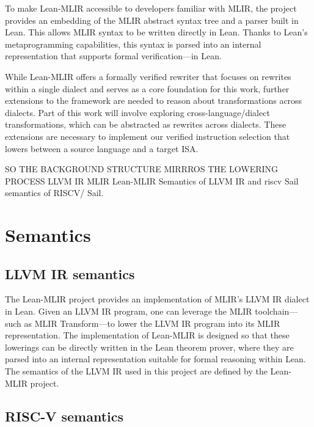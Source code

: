 To make Lean-MLIR accessible to developers familiar with MLIR, the project provides an embedding of the MLIR abstract syntax tree and a parser built in Lean. This allows MLIR syntax to be written directly in Lean. Thanks to Lean’s metaprogramming capabilities, this syntax is parsed into an internal representation that supports formal verification—in Lean.

While Lean-MLIR offers a formally verified rewriter that focuses on rewrites within a single dialect and serves as a core foundation for this work, further extensions to the framework are needed to reason about transformations across dialects.  Part of this work will involve exploring cross-language/dialect transformations, which can be abstracted as rewrites across dialects. These extensions are necessary to implement our verified instruction selection that lowers between a source language and a target ISA. 








SO THE BACKGROUND STRUCTURE MIRRROS THE LOWERING PROCESS 
 LLVM IR
 MLIR 
 Lean-MLIR 
 Semantics of LLVM IR and 
 riscv 
 Sail semantics of RISCV/ Sail. 




\section {Semantics}
\subsection {LLVM IR semantics}
The Lean-MLIR project provides an implementation of MLIR's LLVM IR dialect in Lean. Given an LLVM IR program, one can leverage the MLIR toolchain—such as MLIR Transform—to lower the LLVM IR program into its MLIR representation.
The implementation of Lean-MLIR is designed so that these lowerings can be directly written in the Lean theorem prover, where they are parsed into an internal representation suitable for formal reasoning within Lean.
The semantics of the LLVM IR used in this project are defined by the Lean-MLIR project.

\subsection {RISC-V semantics}








